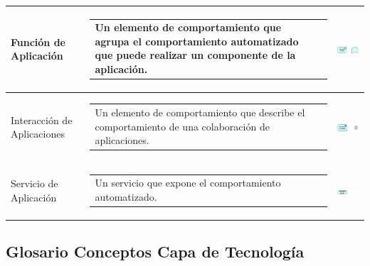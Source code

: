 \begin{longtable}[c]{|p{2.5cm}|l|c|}
	Función de Aplicación		& \begin{tabular}[c]{p{7cm}@{}l@{}}Un elemento de comportamiento que agrupa el comportamiento automatizado que puede realizar un componente de la aplicación.\end{tabular} & \includegraphics[width=35mm]{arquitectura/adm_lenguaje/imgs/application/ApplicationFunction}          \\ \hline
	Interacción de Aplicaciones	& \begin{tabular}[c]{p{7cm}@{}l@{}}Un elemento de comportamiento que describe el comportamiento de una colaboración de aplicaciones.\end{tabular} & \includegraphics[width=35mm]{arquitectura/adm_lenguaje/imgs/application/ApplicationInteraction}          \\ \hline
	Servicio de Aplicación	   	& \begin{tabular}[c]{p{7cm}@{}l@{}}Un servicio que expone el comportamiento automatizado.\end{tabular} & \includegraphics[width=35mm]{arquitectura/adm_lenguaje/imgs/application/ApplicationService}          \\ \hline
\end{longtable}

\newpage

\subsection{Glosario Conceptos Capa de Tecnología}


